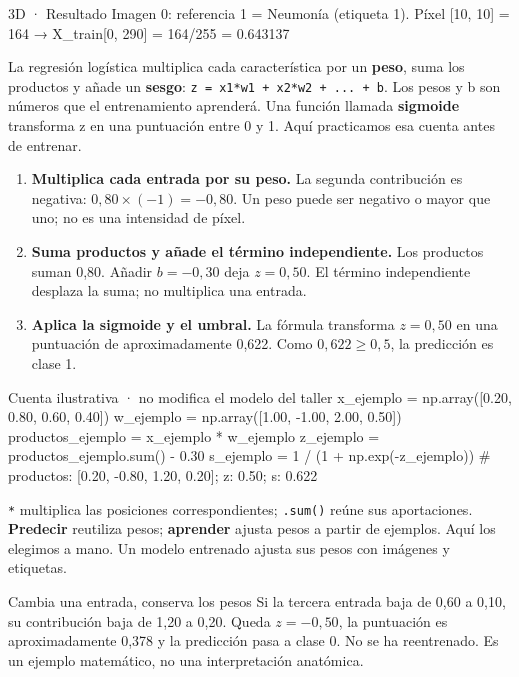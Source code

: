 
\begin{Salida}{3D · Resultado}
Imagen 0: referencia 1 = Neumonía (etiqueta 1).
Píxel [10, 10] = 164 → X_train[0, 290] = 164/255 = 0.643137
\end{Salida}

\label{bloque-4}

La regresión logística multiplica cada característica por un \textbf{peso}, suma los productos y añade un \textbf{sesgo}: \texttt{\small z =\allowbreak{} x1*w1 + x2*w2 + .\allowbreak{}.\allowbreak{}.\allowbreak{} + b}. Los pesos y b son números que el entrenamiento aprenderá. Una función llamada \textbf{sigmoide} transforma z en una puntuación entre 0 y 1. Aquí practicamos esa cuenta antes de entrenar.


\begin{enumerate}
\item \textbf{Multiplica cada entrada por su peso.} La segunda contribución es negativa: \(0,80\times(-1)=-0,80\). Un peso puede ser negativo o mayor que uno; no es una intensidad de píxel.
\item \textbf{Suma productos y añade el término independiente.} Los productos suman 0,80. Añadir \(b=-0,30\) deja \(z=0,50\). El término independiente desplaza la suma; no multiplica una entrada.
\item \textbf{Aplica la sigmoide y el umbral.} La fórmula transforma \(z=0,50\) en una puntuación de aproximadamente 0,622. Como \(0,622\geq0,5\), la predicción es clase 1.
\end{enumerate}
\begin{Codigo}{Cuenta ilustrativa · no modifica el modelo del taller}
x_ejemplo = np.array([0.20, 0.80, 0.60, 0.40])
w_ejemplo = np.array([1.00, -1.00, 2.00, 0.50])
productos_ejemplo = x_ejemplo * w_ejemplo
z_ejemplo = productos_ejemplo.sum() - 0.30
s_ejemplo = 1 / (1 + np.exp(-z_ejemplo))
# productos: [0.20, -0.80, 1.20, 0.20]; z: 0.50; s: 0.622
\end{Codigo}
\texttt{*} multiplica las posiciones correspondientes; \texttt{.sum()} reúne sus aportaciones. \textbf{Predecir} reutiliza pesos; \textbf{aprender} ajusta pesos a partir de ejemplos. Aquí los elegimos a mano. Un modelo entrenado ajusta sus pesos con imágenes y etiquetas.
\begin{Practica}{Cambia una entrada, conserva los pesos}
Si la tercera entrada baja de 0,60 a 0,10, su contribución baja de 1,20 a 0,20. Queda \(z=-0,50\), la puntuación es aproximadamente 0,378 y la predicción pasa a clase 0. No se ha reentrenado. Es un ejemplo matemático, no una interpretación anatómica.
\end{Practica}



